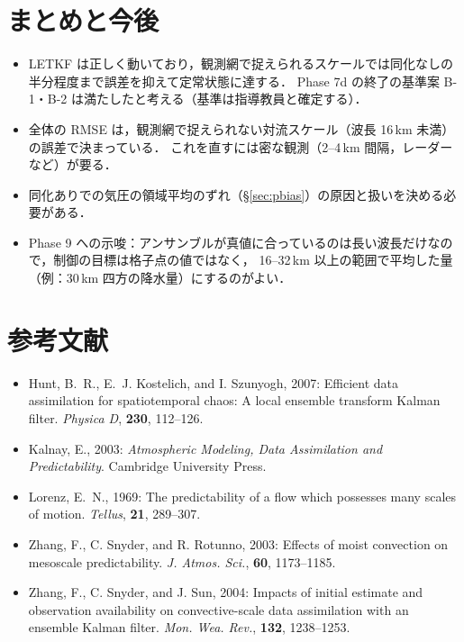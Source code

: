 \documentclass[dvipdfmx,a4paper,10.5pt]{jarticle}
\numberwithin{equation}{section}
\begin{document}
\section{まとめと今後}
\begin{itemize}
  \item LETKF は正しく動いており，観測網で捉えられるスケールでは同化なしの半分程度まで誤差を抑えて定常状態に達する．
        Phase 7d の終了の基準案 B-1・B-2 は満たしたと考える（基準は指導教員と確定する）．
  \item 全体の RMSE は，観測網で捉えられない対流スケール（波長 16\,km 未満）の誤差で決まっている．
        これを直すには密な観測（2--4\,km 間隔，レーダーなど）が要る．
  \item 同化ありでの気圧の領域平均のずれ（\S\ref{sec:pbias}）の原因と扱いを決める必要がある．
  \item Phase 9 への示唆：アンサンブルが真値に合っているのは長い波長だけなので，制御の目標は格子点の値ではなく，
        16--32\,km 以上の範囲で平均した量（例：30\,km 四方の降水量）にするのがよい．
\end{itemize}

\section*{参考文献}
\begin{itemize}
  \item Hunt, B.~R., E.~J. Kostelich, and I. Szunyogh, 2007: Efficient data assimilation for spatiotemporal chaos: A local ensemble transform Kalman filter. \textit{Physica D}, \textbf{230}, 112--126.
  \item Kalnay, E., 2003: \textit{Atmospheric Modeling, Data Assimilation and Predictability}. Cambridge University Press.
  \item Lorenz, E.~N., 1969: The predictability of a flow which possesses many scales of motion. \textit{Tellus}, \textbf{21}, 289--307.
  \item Zhang, F., C. Snyder, and R. Rotunno, 2003: Effects of moist convection on mesoscale predictability. \textit{J. Atmos. Sci.}, \textbf{60}, 1173--1185.
  \item Zhang, F., C. Snyder, and J. Sun, 2004: Impacts of initial estimate and observation availability on convective-scale data assimilation with an ensemble Kalman filter. \textit{Mon. Wea. Rev.}, \textbf{132}, 1238--1253.
\end{itemize}
\end{document}
